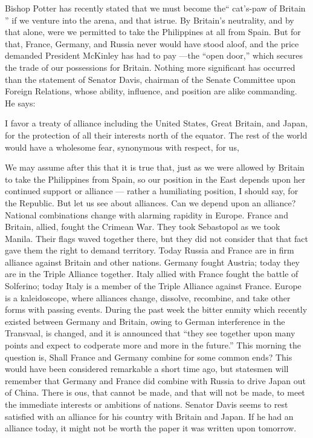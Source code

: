 \documentclass[11pt,openany]{book}
\begin{document}
Bishop Potter has recently stated that we must become the`` cat's-paw of Britain '' if we venture into the arena, and that istrue. By Britain's neutrality, and by that alone, were we permitted to take the Philippines at all from Spain. But for that, France, Germany, and Russia never would have stood aloof, and the price demanded President McKinley has had to pay ---the ``open door,'' which secures the trade of our possessions for Britain. Nothing more significant has occurred than the statement of Senator Davis, chairman of the Senate Committee upon Foreign Relations, whose ability, influence, and position are alike commanding. He says:

I favor a treaty of alliance including the United States, Great Britain, and Japan, for the protection of all their interests north of the equator. The rest of the world would have a wholesome fear, synonymous with respect, for us,

We may assume after this that it is true that, just as we were allowed by Britain to take the Philippines from Spain, so our position in the East depends upon her continued support or alliance --- rather a humiliating position, I should say, for the Republic. But let us see about alliances. Can we depend upon an alliance? National combinations change with alarming rapidity in Europe. France and Britain, allied, fought the Crimean War. They took Sebastopol as we took Manila. Their flags waved together there, bnt they did not consider that that fact gave them the right to demand territory. Today Russia and France are in firm alliance against Britain and other nations. Germany fought Austria; today they are in the Triple Alliance together. Italy allied with France fought the battle of Solferino; today Italy is a member of the Triple Alliance against France. Europe is a kaleidoscope, where alliances change, dissolve, recombine, and take other forms with passing events. During the past week the bitter enmity which recently existed between Germany and Britain, owing to German interference in the Transvaal, is changed, and it is announced that ``they see together upon many points and expect to codperate more and more in the future.'' This morning the question is, Shall France and Germany combine for some common ends? This would have been considered remarkable a short time ago, but statesmen will remember that Germany and France did combine with Russia to drive Japan out of China. There is ous, that cannot be made, and that will not be made, to meet the immediate interests or ambitions of nations. Senator Davis seems to rest satisfied with an alliance for his country with Britain and Japan. If he had an alliance today, it might not be worth the paper it was written upon tomorrow.
\end{document}
